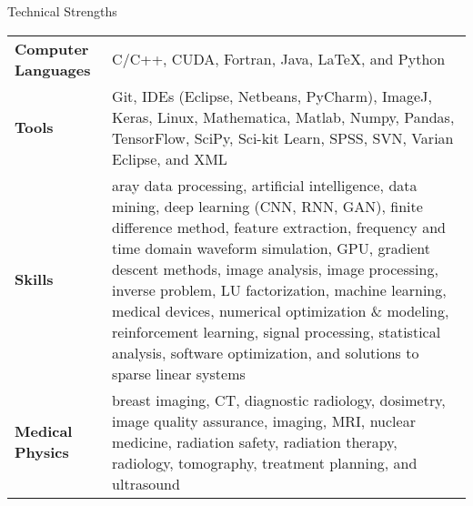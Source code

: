 \documentclass{resume} %
\begin{document}
\newpage
\begin{rSection}{Technical Strengths}

\begin{tabular}{p{5cm}p{11cm}}
\textbf{Computer Languages} &  C/C++, CUDA, Fortran, Java, \LaTeX, and Python\\
\textbf{Tools} &  Git, IDEs (Eclipse, Netbeans, PyCharm), ImageJ, Keras, Linux, Mathematica, Matlab, Numpy, Pandas, TensorFlow, SciPy, Sci-kit Learn, SPSS, SVN, Varian Eclipse, and XML \\
\textbf{Skills} & aray data processing, artificial intelligence, data mining, deep learning (CNN, RNN, GAN), finite difference method, feature extraction, frequency and time domain waveform simulation, GPU, gradient descent methods, image analysis, image processing, inverse problem, LU factorization, machine learning, medical devices, numerical optimization \& modeling, reinforcement learning, signal processing, statistical analysis, software optimization, and solutions to sparse linear systems\\
\textbf{Medical Physics} & breast imaging, CT, diagnostic radiology, dosimetry, image quality assurance, imaging, MRI, nuclear medicine, radiation safety, radiation therapy, radiology, tomography, treatment planning, and ultrasound
\end{tabular} 
\end{rSection}
\
\end{document}
